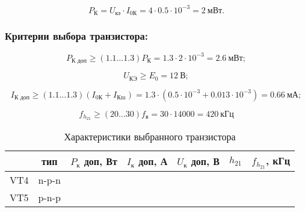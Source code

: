   \begin{equation}
  \label{eq:equation6_10}
    P_{\text{К}} = U_{\text{кэ}} \cdot I_{\text{0К}} = 4 \cdot 0.5 \cdot 10^{-3} = 2~\text{мВт}. 
  \end{equation}
  

  \subsubsection{Критерии выбора транзистора:} %

  \begin{equation}
  \label{eq:equation6_11}
    P_{\text{К доп}} \geq (1.1 \ldots 1.3) P_{\text{К}} = 1.3 \cdot 2 \cdot 10^{-3} = 2.6~\text{мВт};
  \end{equation} 

  \begin{equation}
   \label{eq:equation6_12}
     U_{\text{КЭ}} \geq E_0 = 12~\text{В};
  \end{equation} 

  \begin{equation}
  \label{eq:equation6_13}
    I_{\text{К доп}} \geq (1.1 \ldots 1.3)(I_{\text{0К}} + I_{\text{Кm}}) = 1.3 \cdot (0.5 \cdot 10^{-3} + 0.013 \cdot 10^{-3}) = 0.66~\text{мА}; 
  \end{equation} 

  \begin{equation}
   \label{eq:equation6_14}
     f_{h_{21}} \geq (20 \ldots 30) f_{\text{в}} = 30 \cdot 14000 = 420~\text{кГц}
  \end{equation} 

\begin{table}[htbp]
\caption{Характеристики выбранного транзистора}
\begin{center}\begin{tabular}{|c|c|c|c|c|c|c|}
\hline 
  & тип & $P_{\text{к}}$ доп, Вт & $I_{\text{к}}$ доп, А & $U_{\text{к}}$ доп, В & $h_{21}$ &  $f_{h_{21}}$, кГц \\ 
\hline 
VT4 & n-p-n &   &  &  &  & \\ 
\hline 
VT5 & p-n-p &   &  &  &  &  \\ 
\hline 
\end{tabular} 
\end{center}
\end{table}

